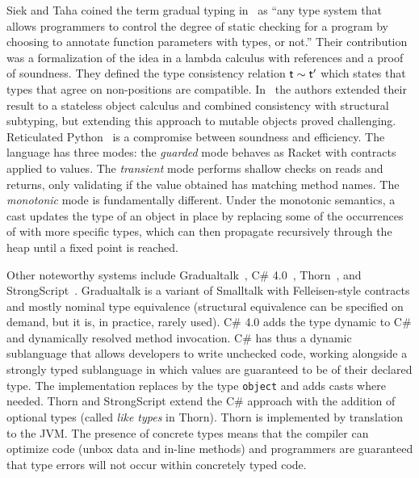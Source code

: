 \documentclass[acmsmall, anonymous, authordraft, review]{acmart} %
\begin{document}
Siek and Taha coined the term gradual typing in~\cite{SiekTaha06} as ``any
type system that allows programmers to control the degree of static checking
for a program by choosing to annotate function parameters with types, or
not.'' Their contribution was a formalization of the idea in a lambda
calculus with references and a proof of soundness. They defined the type
consistency relation $\t \sim \tp$ which states that types that agree on
non-\any positions are compatible.  In~\cite{SiekTaha07} the authors
extended their result to a stateless object calculus and combined
consistency with structural subtyping, but extending this approach to
mutable objects proved challenging.  Reticulated Python~\cite{siek14} is a
compromise between soundness and efficiency.  The language has three modes:
the \emph{guarded} mode behaves as Racket with contracts applied to values.
The \emph{transient} mode performs shallow checks on reads and returns, only
validating if the value obtained has matching method names.  The
\emph{monotonic} mode is fundamentally different. Under the monotonic
semantics, a cast updates the type of an object in place by replacing some
of the occurrences of \any with more specific types, which can then
propagate recursively through the heap until a fixed point is reached.

Other noteworthy systems include Gradualtalk~\cite{GS13}, C\#
4.0~\cite{Bierman10}, Thorn~\cite{oopsla09}, and
StrongScript~\cite{ecoop15}. Gradualtalk is a variant of Smalltalk with
Felleisen-style contracts and mostly nominal type equivalence (structural
equivalence can be specified on demand, but it is, in practice, rarely
used). C\# 4.0 adds the type {\sf dynamic} to C\# and dynamically resolved
method invocation.  C\# has thus a dynamic sublanguage that allows
developers to write unchecked code, working alongside a strongly typed
sublanguage in which values are guaranteed to be of their declared type.
The implementation replaces \any by the type {\tt object} and adds casts
where needed.  Thorn and StrongScript extend the C\# approach with the
addition of optional types (called {\em like types} in Thorn).  Thorn is
implemented by translation to the JVM. The presence of concrete types means
that the compiler can optimize code (unbox data and in-line methods) and
programmers are guaranteed that type errors will not occur within concretely
typed code.

\newcommand{\rot}[1]{\rotatebox{80}{#1}}
\newcommand{\X}{\EM{\bullet}}
\newcommand{\XX}{\EM{\bullet^{(2)}}}
\newcommand{\XY}{\EM{\bullet^{(1)}}}
\end{document}
